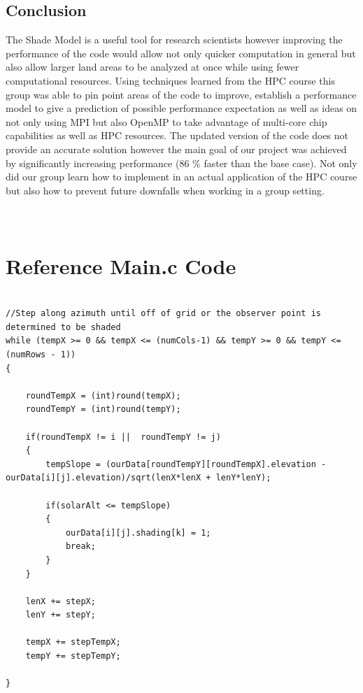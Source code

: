 \documentclass[]{article}%
\begin{document}
\subsection{Conclusion}

The Shade Model is a useful tool for research scientists however improving the performance of the code would allow not only quicker computation in general but also allow larger land areas to be analyzed at once while using fewer computational resources. Using techniques learned from the HPC course this group was able to pin point areas of the code to improve, establish a performance model to give a prediction of possible performance expectation as well as ideas on not only using MPI but also OpenMP to take advantage of multi-core chip capabilities as well as HPC resources. The updated version of the code does not provide an accurate solution however the main goal of our project was achieved  by significantly increasing performance (86 \% faster than the base case). Not only did our group learn how to implement in an actual application of the HPC course but also how to prevent future downfalls when working in a group setting.





\newpage
\appendix
\section{\\Reference Main.c Code} \label{App:loop_code_main.c}

{\small
\begin{verbatim}

//Step along azimuth until off of grid or the observer point is determined to be shaded
while (tempX >= 0 && tempX <= (numCols-1) && tempY >= 0 && tempY <= (numRows - 1))
{	

	roundTempX = (int)round(tempX);
	roundTempY = (int)round(tempY);			

	if(roundTempX != i ||  roundTempY != j) 
	{
		tempSlope = (ourData[roundTempY][roundTempX].elevation - ourData[i][j].elevation)/sqrt(lenX*lenX + lenY*lenY);	

		if(solarAlt <= tempSlope)
		{	
			ourData[i][j].shading[k] = 1;
			break;
		}
	}												

	lenX += stepX;		
	lenY += stepY;

	tempX += stepTempX;
	tempY += stepTempY;

}
\end{verbatim}}
\end{document}
